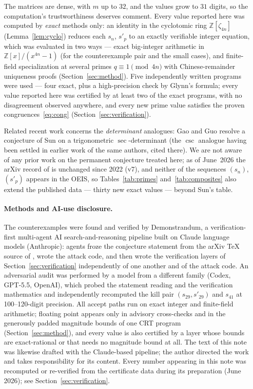 \documentclass[10pt]{article}
\theoremstyle{remark}
\newcommand{\Z}{\mathbb{Z}}
\begin{document}
The matrices are dense, with $m$ up to $32$, and the values grow to $31$
digits, so the computation's trustworthiness deserves comment. Every value
reported here was computed by
\emph{exact} methods only: an identity in the cyclotomic ring
$\Z[\zeta_{4n}]$ (Lemma~\ref{lem:cyclo}) reduces each $s_n$, $s'_p$ to an
exactly verifiable integer equation, which was evaluated in two ways ---
exact big-integer arithmetic in $\Z[x]/(x^{4n}-1)$ (for the
counterexample pair and the small cases), and finite-field
specialization at several primes $q\equiv 1\pmod{4n}$ with
Chinese-remainder uniqueness proofs (Section~\ref{sec:method}). Five
independently written programs were used --- four exact, plus a
high-precision check by Glynn's formula; every value reported here was
certified by at least two of the exact programs, with no disagreement
observed anywhere, and every new prime value satisfies the proven
congruences~\eqref{eq:cong} (Section~\ref{sec:verification}).

Related recent work concerns the \emph{determinant} analogues: Gao and Guo
\cite{GaoGuo2025} resolve a conjecture of Sun on a trigonometric
$\sec$-determinant (the $\csc$ analogue having been settled in earlier
work of the same authors, cited there). We are not aware of any prior work on the permanent
conjecture treated here; as of June~2026 the arXiv record of \cite{Sun2021}
is unchanged since 2022 (v7), and neither of the sequences $(s_n)$,
$(s'_p)$ appears in the OEIS, so Tables~\ref{tab:primes}
and~\ref{tab:composites} also extend the published data --- thirty new
exact values --- beyond Sun's table.

\paragraph{Methods and AI-use disclosure.}
The counterexamples were found and verified by Demonstrandum, a
verification-first multi-agent AI search-and-reasoning pipeline built on
Claude language models (Anthropic):
agents froze the conjecture statement from the arXiv \TeX{} source of
\cite{Sun2021}, wrote the attack code, and then wrote the verification
layers of Section~\ref{sec:verification} independently of one another and
of the attack code. An adversarial audit was performed by a model from a
different family (Codex, GPT-5.5, OpenAI), which probed the statement
reading and the verification mathematics and independently recomputed the
kill pair $(s_{29},s'_{29})$ and $s_{41}$ at 100--120-digit precision. All
accept paths run on exact integer and finite-field arithmetic; floating
point appears only in advisory cross-checks and in the generously padded
magnitude bounds of one CRT program (Section~\ref{sec:method}), and every
value is also certified by a layer whose bounds are exact-rational or
that needs no magnitude bound at all.
The text of this note was likewise drafted with the Claude-based pipeline;
the author directed the work and takes responsibility for its content.
Every number appearing in this note was recomputed or re-verified from the
certificate data during its preparation (June 2026); see
Section~\ref{sec:verification}.
\end{document}
